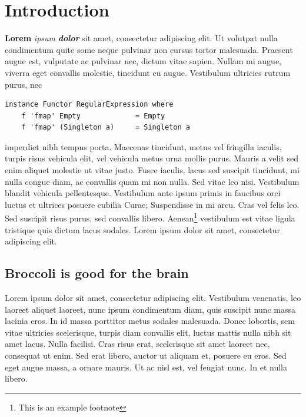 \section{Introduction}

\textbf{Lorem} \emph{ipsum} \textbf{\emph{dolor}} sit amet, consectetur
adipiscing elit. Ut volutpat nulla condimentum quite some neque pulvinar
non cursus tortor malesuada. Praesent augue est, vulputate ac pulvinar
nec, dictum vitae sapien. Nullam mi augue, viverra eget convallis
molestie, tincidunt eu augue. Vestibulum ultricies rutrum purus, nec

\begin{verbatim}
instance Functor RegularExpression where
    f 'fmap' Empty             = Empty
    f 'fmap' (Singleton a)     = Singleton a
\end{verbatim}

imperdiet nibh tempus porta. Maecenas tincidunt, metus vel fringilla
iaculis, turpis risus vehicula elit, vel vehicula metus urna mollis
purus. Mauris a velit sed enim aliquet molestie ut vitae justo. Fusce
iaculis, lacus sed suscipit tincidunt, mi nulla congue diam, ac
convallis quam mi non nulla. Sed vitae leo nisi. Vestibulum blandit
vehicula pellentesque. Vestibulum ante ipsum primis in faucibus orci
luctus et ultrices posuere cubilia Curae; Suspendisse in mi arcu. Cras
vel felis leo. Sed suscipit risus purus, sed convallis libero.
Aenean\footnote{This is an example footnote} vestibulum est vitae ligula
tristique quis dictum lacus sodales. Lorem ipsum dolor sit amet,
consectetur adipiscing elit.

\subsection{Broccoli is good for the brain}

Lorem ipsum dolor sit amet, consectetur adipiscing elit. Vestibulum
venenatis, leo laoreet aliquet laoreet, nunc ipsum condimentum diam,
quis suscipit nunc massa lacinia eros. In id massa porttitor metus
sodales malesuada. Donec lobortis, sem vitae ultricies scelerisque,
turpis diam convallis elit, luctus mattis nulla nibh sit amet lacus.
Nulla facilisi. Cras risus erat, scelerisque sit amet laoreet nec,
consequat ut enim. Sed erat libero, auctor ut aliquam et, posuere eu
eros. Sed eget augue massa, a ornare mauris. Ut ac nisl est, vel feugiat
nunc. In et nulla libero.

